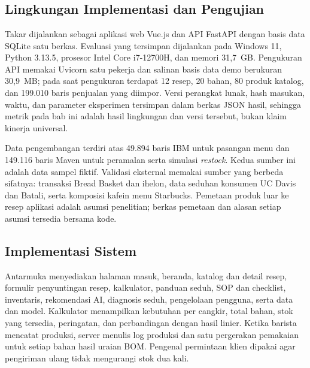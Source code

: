 \chapter{\babEmpat}
\label{bab:hasil}

\section{Lingkungan Implementasi dan Pengujian}
\label{sec:lingkungan-implementasi}

Takar dijalankan sebagai aplikasi web Vue.js dan API FastAPI dengan basis data SQLite satu berkas. Evaluasi yang tersimpan dijalankan pada Windows 11, Python 3.13.5, prosesor Intel Core i7-12700H, dan memori 31,7~GB. Pengukuran API memakai Uvicorn satu pekerja dan salinan basis data demo berukuran 30,9~MB; pada saat pengukuran terdapat 12 resep, 20 bahan, 80 produk katalog, dan 199.010 baris penjualan yang diimpor. Versi perangkat lunak, hash masukan, waktu, dan parameter eksperimen tersimpan dalam berkas JSON hasil, sehingga metrik pada bab ini adalah hasil lingkungan dan versi tersebut, bukan klaim kinerja universal.

Data pengembangan terdiri atas 49.894 baris IBM untuk pasangan menu dan 149.116 baris Maven untuk peramalan serta simulasi \textit{restock}. Kedua sumber ini adalah data sampel fiktif. Validasi eksternal memakai sumber yang berbeda sifatnya: transaksi Bread Basket dan ihelon, data seduhan konsumen UC Davis dan Batali, serta komposisi kafein menu Starbucks. Pemetaan produk luar ke resep aplikasi adalah asumsi penelitian; berkas pemetaan dan alasan setiap asumsi tersedia bersama kode.

\section{Implementasi Sistem}
\label{sec:implementasi}

Antarmuka menyediakan halaman masuk, beranda, katalog dan detail resep, formulir penyuntingan resep, kalkulator, panduan seduh, SOP dan checklist, inventaris, rekomendasi AI, diagnosis seduh, pengelolaan pengguna, serta data dan model. Kalkulator menampilkan kebutuhan per cangkir, total bahan, stok yang tersedia, peringatan, dan perbandingan dengan hasil linier. Ketika barista mencatat produksi, server menulis log produksi dan satu pergerakan pemakaian untuk setiap bahan hasil uraian BOM. Pengenal permintaan klien dipakai agar pengiriman ulang tidak mengurangi stok dua kali.

